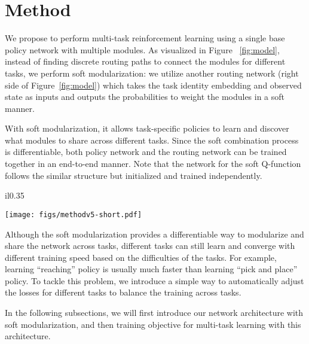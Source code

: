 \documentclass{article}
\begin{document}
\vspace{-0.1in}
\section{Method}\label{sec:method}
\vspace{-0.1in}

We propose to perform multi-task reinforcement learning using a single base policy network with multiple modules. As visualized in Figure ~\ref{fig:model}, instead of finding discrete routing paths to connect the modules for different tasks, we perform soft modularization: we utilize another routing network (right side of Figure~\ref{fig:model}) which takes the task identity embedding and observed state as inputs and outputs the probabilities to weight the modules in a soft manner.

With soft modularization, it allows task-specific policies to learn and discover what modules to share across different tasks. Since the soft combination process is differentiable, both policy network and the routing network can be trained together in an end-to-end manner. Note that the network for the soft Q-function follows the similar structure but initialized and trained independently. 

\begin{wrapfigure}{il}{0.35\textwidth}
  \vspace{-0.25in}
  \begin{center}
    \texttt{[image: figs/methodv5-short.pdf]}
  \end{center}
    \caption{\small{Our framework contains a base policy network with multiple modules (left) and a routing network (right) generating connections between modules in the base policy network. }}
    \label{fig:model}
  \vspace{-0.45in}
\end{wrapfigure}
Although the soft modularization provides a differentiable way to modularize and share the network across tasks, different tasks can still learn and converge with different training speed based on the difficulties of the tasks. For example, learning ``reaching'' policy is usually much faster than learning ``pick and place'' policy. To tackle this problem, we introduce a simple way to automatically adjust the losses for different tasks to balance the training across tasks.

In the following subsections, we will first introduce our network architecture with soft modularization, and then training objective for multi-task learning with this architecture. 
\end{document}
